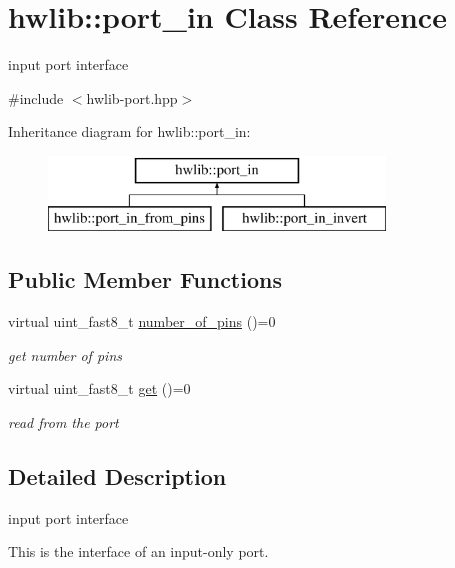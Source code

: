 \hypertarget{classhwlib_1_1port__in}{}\section{hwlib\+:\+:port\+\_\+in Class Reference}
\label{classhwlib_1_1port__in}


input port interface  




{\ttfamily \#include $<$hwlib-\/port.\+hpp$>$}

Inheritance diagram for hwlib\+:\+:port\+\_\+in\+:\begin{figure}[H]
\begin{center}
\leavevmode
\includegraphics[height=2.000000cm]{classhwlib_1_1port__in}
\end{center}
\end{figure}
\subsection*{Public Member Functions}
\begin{DoxyCompactItemize}
\item 
virtual uint\+\_\+fast8\+\_\+t \hyperlink{classhwlib_1_1port__in_a3498fc0158e1e460a00d671df629fe22}{number\+\_\+of\+\_\+pins} ()=0
\begin{DoxyCompactList}\small\item\em get number of pins \end{DoxyCompactList}\item 
virtual uint\+\_\+fast8\+\_\+t \hyperlink{classhwlib_1_1port__in_a3c0a1346a61c538424048b61c1038e0c}{get} ()=0
\begin{DoxyCompactList}\small\item\em read from the port \end{DoxyCompactList}\end{DoxyCompactItemize}


\subsection{Detailed Description}
input port interface 

This is the interface of an input-\/only port. 

